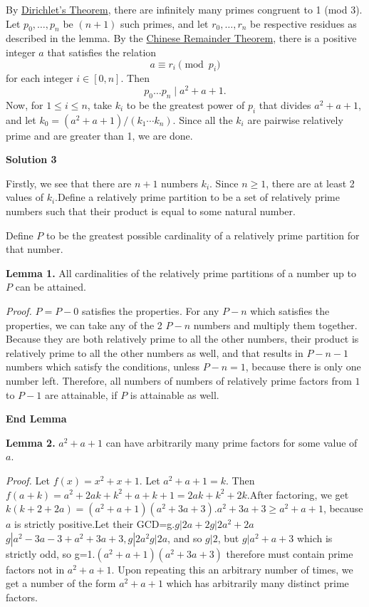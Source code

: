 \begin{enumerate}
 By \href{https://artofproblemsolving.com/wiki/index.php?title=Dirichlet\%27s\_Theorem}{Dirichlet's Theorem}, there are infinitely many primes congruent to 1 (mod 3).  Let $p_0, \dotsc, p_n$ be $(n+1)$ such primes, and let $r_0, \dotsc, r_n$ be respective residues as described in the lemma.  By the \href{https://artofproblemsolving.com/wiki/index.php?title=Chinese\_Remainder\_Theorem}{Chinese Remainder Theorem}, there is a positive integer $a$ that satisfies the relation
 \[a \equiv r_i \pmod{p_i}\]for each integer $i \in [0,n]$.  Then
 \[p_0 \dotsc p_n \mid a^2+a+1 .\]Now, for $1 \le i \le n$, take $k_i$ to be the greatest power of $p_i$ that divides $a^2 + a +1$, and let $k_0 = (a^2+a+1)/(k_1 \dotsm k_n)$.  Since all the $k_i$ are pairwise relatively prime and are greater than 1, we are done. 

 



\textbf{Solution 3}

Firstly, we see that there are $n + 1$ numbers $k_i$. Since $n\geq1$, there are at least 2 values of $k_i$.Define a relatively prime partition to be a set of relatively prime numbers such that their product is equal to some natural number.

 Define $P$ to be the greatest possible cardinality of a relatively prime partition for that number.

 \textbf{Lemma 1.} All cardinalities of the relatively prime partitions of a number up to $P$ can be attained.

 \textit{Proof.} $P = P - 0$ satisfies the properties. For any $P - n$ which satisfies the properties, we can take any of the 2 $P - n$ numbers and multiply them together. Because they are both relatively prime to all the other numbers, their product is relatively prime to all the other numbers as well, and that results in $P - n - 1$ numbers which satisfy the conditions, unless $P - n = 1$, because there is only one number left. Therefore, all numbers of numbers of relatively prime factors from $1$ to $P - 1$ are attainable, if $P$ is attainable as well.

 \textbf{End Lemma}

 \textbf{Lemma 2.} $a^2 + a + 1$ can have arbitrarily many prime factors for some value of $a$.

 \textit{Proof.} Let $f(x) = x^2 + x + 1$. Let $a^2 + a + 1 = k$. Then $f(a + k) = a^2 + 2ak + k^2 + a + k + 1 = 2ak + k^2 + 2k$.After factoring, we get $k(k + 2 + 2a) = (a^2 + a + 1)(a^2 + 3a + 3)$.$a^2 + 3a + 3 \geq a^2 + a + 1$, because $a$ is strictly positive.Let their GCD=g.$g|2a + 2$$g|2a^2 + 2a$$g|a^2 - 3a - 3 + a^2 + 3a + 3, g|2a^2$$g|2a$, and so $g|2$, but $g|a^2 + a + 3$ which is strictly odd, so g=1.$(a^2 + a + 1)(a^2 + 3a + 3)$ therefore must contain prime factors not in $a^2 + a + 1$. Upon repeating this an arbitrary number of times, we get a number of the form $a^2 + a + 1$ which has arbitrarily many distinct prime factors.


\end{enumerate}
